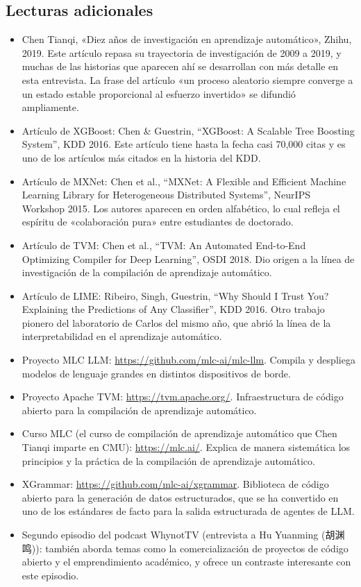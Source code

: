 \subsection{Lecturas adicionales}

\begin{itemize}
    \item Chen Tianqi, «Diez años de investigación en aprendizaje automático», Zhihu, 2019. Este artículo repasa su trayectoria de investigación de 2009 a 2019, y muchas de las historias que aparecen ahí se desarrollan con más detalle en esta entrevista. La frase del artículo «un proceso aleatorio siempre converge a un estado estable proporcional al esfuerzo invertido» se difundió ampliamente.
    \item Artículo de XGBoost: Chen \& Guestrin, ``XGBoost: A Scalable Tree Boosting System'', KDD 2016. Este artículo tiene hasta la fecha casi 70,000 citas y es uno de los artículos más citados en la historia del KDD.
    \item Artículo de MXNet: Chen et al., ``MXNet: A Flexible and Efficient Machine Learning Library for Heterogeneous Distributed Systems'', NeurIPS Workshop 2015. Los autores aparecen en orden alfabético, lo cual refleja el espíritu de «colaboración pura» entre estudiantes de doctorado.
    \item Artículo de TVM: Chen et al., ``TVM: An Automated End-to-End Optimizing Compiler for Deep Learning'', OSDI 2018. Dio origen a la línea de investigación de la compilación de aprendizaje automático.
    \item Artículo de LIME: Ribeiro, Singh, Guestrin, ``Why Should I Trust You? Explaining the Predictions of Any Classifier'', KDD 2016. Otro trabajo pionero del laboratorio de Carlos del mismo año, que abrió la línea de la interpretabilidad en el aprendizaje automático.
    \item Proyecto MLC LLM: \url{https://github.com/mlc-ai/mlc-llm}. Compila y despliega modelos de lenguaje grandes en distintos dispositivos de borde.
    \item Proyecto Apache TVM: \url{https://tvm.apache.org/}. Infraestructura de código abierto para la compilación de aprendizaje automático.
    \item Curso MLC (el curso de compilación de aprendizaje automático que Chen Tianqi imparte en CMU): \url{https://mlc.ai/}. Explica de manera sistemática los principios y la práctica de la compilación de aprendizaje automático.
    \item XGrammar: \url{https://github.com/mlc-ai/xgrammar}. Biblioteca de código abierto para la generación de datos estructurados, que se ha convertido en uno de los estándares de facto para la salida estructurada de agentes de LLM.
    \item Segundo episodio del podcast WhynotTV (entrevista a Hu Yuanming (胡渊鸣)): también aborda temas como la comercialización de proyectos de código abierto y el emprendimiento académico, y ofrece un contraste interesante con este episodio.
\end{itemize}


